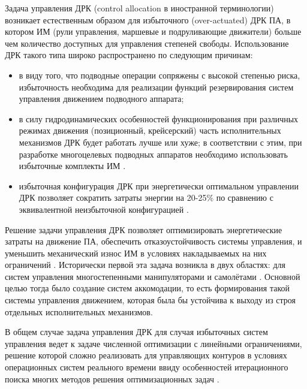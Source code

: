 {\actuality}
Задача управления ДРК (control allocation в иностранной терминологии) возникает естественным образом для избыточного (over-actuated) ДРК ПА, в котором ИМ (рули управления, маршевые и подруливающие движители) больше чем количество доступных для управления степеней свободы. Использование ДРК такого типа широко распространено по следующим причинам:

\begin{itemize}
    \item в виду того, что подводные операции сопряжены с высокой степенью риска, избыточность необходима для реализации функций резервирования систем управления движением подводного аппарата;
    \item в силу гидродинамических особенностей функционирования при различных режимах движения (позиционный, крейсерский) часть исполнительных механизмов ДРК будет работать лучше или хуже; в соответствии с этим, при разработке многоцелевых подводных аппаратов необходимо использовать избыточные комплекты ИМ \cite{valasek2002design}.
    \item избыточная конфигурация ДРК при энергетически оптимальном управлении ДРК позволяет сократить затраты энергии на 20-25\% по сравнению с эквивалентной неизбыточной конфигурацией \cite{бриллиантов2005разработка}.
\end{itemize}

Решение задачи управления ДРК позволяет оптимизировать энергетические затраты на движение ПА, обеспечить отказоустойчивость системы управления, и уменьшить механический износ ИМ в условиях накладываемых на них ограничений \cite{enns1998control}.
Исторически первой эта задача возникла в двух областях: для систем управления многостепенными манипуляторами \cite{craig2009introduction} и самолётами \cite{bordignon1996constrained}. 
Основной целью тогда было создание систем аккомодации, то есть формирования такой системы управления движением, которая была бы устойчива к выходу из строя отдельных исполнительных механизмов.

В общем случае задача управления ДРК для случая избыточных систем управления ведет к задаче численной оптимизации с линейными ограничениями, решение которой сложно реализовать для управляющих контуров в условиях операционных систем реального времени ввиду особенностей итерационного поиска многих методов решения оптимизационных задач \cite{burken2001two}.


